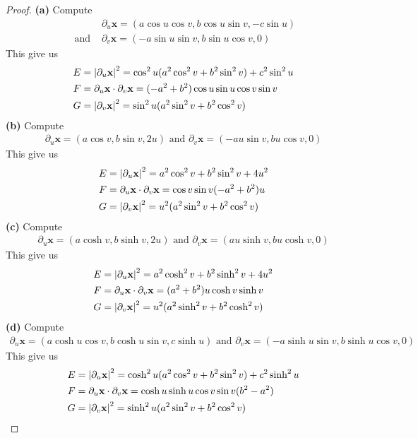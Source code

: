 \documentclass{report}
\begin{document}
\begin{proof}
\textbf{(a)}
Compute 
\begin{align*}
&\partial_u \textbf{x}=(a\cos u \cos v, b \cos u \sin v, -c \sin u)\\
\text{ and }&\partial_v \textbf{x}=(-a \sin u \sin v,b \sin u \cos v, 0)
\end{align*}
This give us 
\begin{align*}
E&=\left|\partial_u\textbf{x}\right|^2= \cos^2 u (a^2\cos ^2v + b^2 \sin^2 v)+c^2 \sin^2 u \\
F&=\partial_u \textbf{x}\cdot \partial_v \textbf{x}=(-a^2+b^2)\cos u \sin u \cos v \sin v\\
G&=\left|\partial_v \textbf{x}\right|^2= \sin^2 u (a^2 \sin^2 v + b^2 \cos ^2 v)
\end{align*}
\textbf{(b)} Compute 
\begin{align*}
\partial_u \textbf{x}=(a\cos v, b \sin v, 2u)\text{ and }\partial_v \textbf{x}=(-au \sin v, b u \cos v, 0)
\end{align*}
This give us 
\begin{align*}
E&=\left|\partial_u \textbf{x}\right|^2= a^2 \cos^2 v + b^2 \sin^2 v + 4u^2\\
F&=\partial_u \textbf{x}\cdot \partial_v \textbf{x}=\cos v \sin v (-a^2 +b^2)u\\
G&=\left|\partial_v \textbf{x}\right|^2 = u^2 (a^2 \sin^2 v+ b^2 \cos ^2 v)
\end{align*}
\textbf{(c)} Compute 
\begin{align*}
  \partial_u \textbf{x}=(a \cosh v, b \sinh v,2u)\text{ and }\partial_v \textbf{x}=(au \sinh v, b u \cosh v, 0)
\end{align*}
This give us 
\begin{align*}
E&=\left|\partial_u \textbf{x}\right|^2 = a^2 \cosh^2 v+ b^2 \sinh^2 v+4u^2\\
F&=\partial_u \textbf{x}\cdot \partial_v \textbf{x}=(a^2+b^2)u \cosh v \sinh v\\
G&=\left|\partial_v \textbf{x}\right|^2= u^2 (a^2 \sinh^2 v+ b^2 \cosh^2 v)
\end{align*}
\textbf{(d)} Compute 
\begin{align*}
\partial_u \textbf{x}=(a \cosh u \cos v , b \cosh u \sin v, c\sinh u)\text{ and }\partial_v \textbf{x}=(-a\sinh u \sin v, b \sinh u \cos v, 0)
\end{align*}
This give us 
\begin{align*}
E&= \left|\partial _u\textbf{x}\right|^2= \cosh^2 u (a^2 \cos^2 v+b^2 \sin^2 v)+c^2 \sinh^2 u\\
F&=\partial_u \textbf{x}\cdot \partial_v \textbf{x}= \cosh u \sinh u \cos v \sin v (b^2-a^2)\\
G&=\left|\partial_v \textbf{x}\right|^2 = \sinh^2 u (a^2 \sin^2 v +b^2 \cos^2 v)
\end{align*}
\end{proof}
\end{document}
